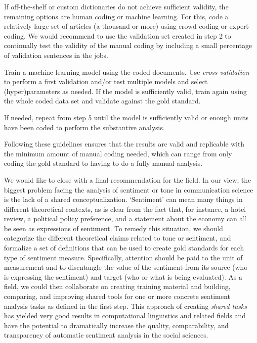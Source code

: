 \begin{APAenumerate}
\item If off-the-shelf or custom dictionaries do not achieve sufficient validity, the remaining options are human coding or machine learning. 
 For this, code a relatively large set of articles (a thousand or more) using crowd coding or expert coding. 
 We would recommend to use the validation set created in step 2 to continually test the validity of the manual coding by including a small percentage of validation sentences in the jobs. 
\item Train a machine learning model using the coded documents. 
  Use \emph{cross-validation} to perform a first validation and/or test multiple models and select (hyper)parameters as needed. 
  If the model is sufficiently valid, train again using the whole coded data set and validate against the gold standard. 
\item If needed, repeat from step 5 until the model is sufficiently valid or enough units have been coded to perform the substantive analysis. 
\end{APAenumerate}

\vspace{1em}

\noindent Following these guidelines ensures that the results are valid and replicable with the minimum amount of manual coding needed,
which can range from only coding the gold standard to having to do a fully manual analysis. 

We would like to close with a final recommendation for the field. 
In our view, the biggest problem facing the analysis of sentiment or tone in communication science is the lack of a shared conceptualization.
`Sentiment' can mean many things in different theoretical contexts, as is clear from the fact that, for instance, a hotel review, a political policy preference,
and a statement about the economy can all be seen as expressions of sentiment. 
To remedy this situation, we should categorize the different theoretical claims related to tone or sentiment,
and formalize a set of definitions that can be used to create gold standards for each type of sentiment measure.
Specifically, attention should be paid to the unit of measurement and to disentangle the value of the sentiment from its source (who is expressing the sentiment) and target (who or what is being evaluated). 
As a field, we could then collaborate on creating training material and building, comparing, and improving shared tools for one or more 
concrete sentiment analysis tasks as defined in the first step.
This approach of creating \emph{shared tasks} has yielded very good results in computational linguistics and related fields
and have the potential to dramatically increase the quality, comparability, and transparency of automatic sentiment analysis in the social sciences. 

